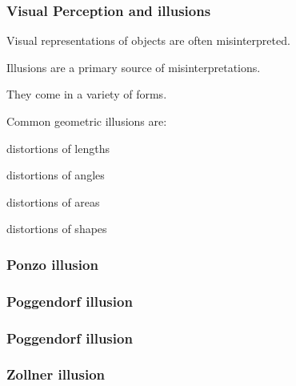 \documentclass[12pt]{beamer}\usepackage[]{graphicx}\usepackage[]{color}
\begin{document}

\begin{frame}
\frametitle{Visual Perception and illusions}

Visual representations of objects are often misinterpreted.

\bi
  \item Illusions are a primary source of misinterpretations.
  \item They come in a variety of forms.
  \item Common geometric illusions are:
  \bi
    \item distortions of lengths
    \item distortions of angles
    \item distortions of areas
    \item distortions of shapes
  \ei
\ei

\end{frame}


\begin{frame}
\frametitle{Ponzo illusion}
\begin{center}
\end{center}
\end{frame}


\begin{frame}
\frametitle{Poggendorf illusion}
\begin{center}
\end{center}
\end{frame}


\begin{frame}
\frametitle{Poggendorf illusion}
\begin{center}
\end{center}
\end{frame}


\begin{frame}
\frametitle{Zollner illusion}
\begin{center}
\end{center}
\end{frame}
\end{document}
